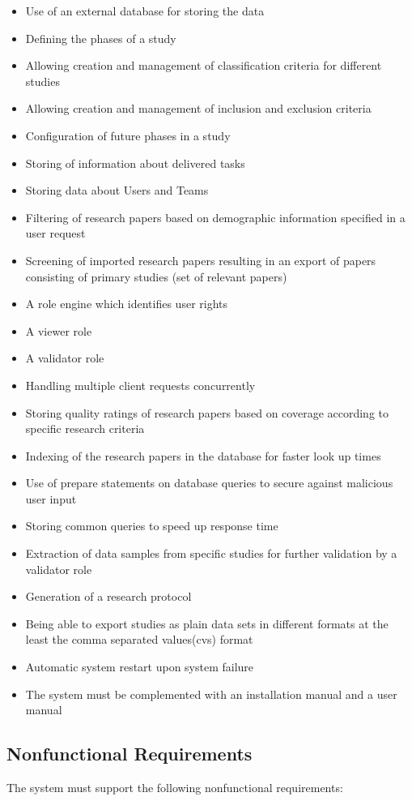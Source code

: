 \begin{itemize}
\item Use of an external database for storing the data
\item Defining the phases of a study
\item Allowing creation and management of classification criteria for different studies
\item Allowing creation and management of inclusion and exclusion criteria
\item Configuration of future phases in a study
\item Storing of information about delivered tasks
\item Storing data about Users and Teams
\item Filtering of research papers based on demographic information specified in a user request
\item Screening of imported research papers resulting in an export of papers consisting of primary studies (set of relevant papers)
\item A role engine which identifies user rights
\item A viewer role
\item A validator role
\item Handling multiple client requests concurrently
\item Storing quality ratings of research papers based on coverage according to specific research criteria
\item Indexing of the research papers in the database for faster look up times
\item Use of prepare statements on database queries to secure against malicious user input
\item Storing common queries to speed up response time
\item Extraction of data samples from specific studies for further validation by a validator role
\item Generation of a research protocol
\item Being able to export studies as plain data sets in different formats at the least the comma separated values(cvs) format
\item Automatic system restart upon system failure
\item The system must be complemented with an installation manual and a user manual
\end{itemize}

\subsection{Nonfunctional Requirements}
The system must support the following nonfunctional requirements:

